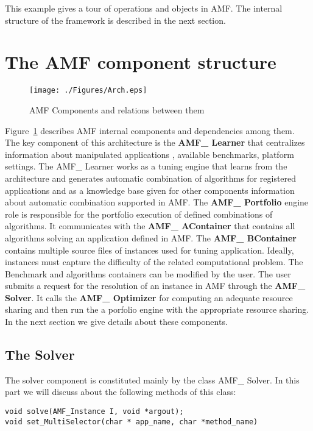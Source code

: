 This example gives a tour of operations and objects in AMF. The internal structure of the framework is 
described in the next section.

\section{The AMF component structure} \label{architecture}

\begin{figure}[!htbp]
\begin{center}
\texttt{[image: ./Figures/Arch.eps]}
\caption{AMF Components and relations between them}
 \label{Arch}
\end{center}
\end{figure}

Figure~\ref{Arch} describes AMF internal components and dependencies among them. The key component of this 
architecture is the \textbf{AMF\_ Learner} that centralizes information about manipulated applications , available benchmarks, 
platform settings. The AMF\_ Learner works as a tuning engine that learns from the architecture and generates automatic 
combination of algorithms for registered applications and as a knowledge base given for other components 
information about automatic combination supported in AMF. The  \textbf{AMF\_ Portfolio} engine role is responsible for the portfolio 
execution of defined  combinations of algorithms. It communicates with the \textbf{AMF\_ AContainer} that contains 
all algorithms solving an application defined in AMF. The \textbf{AMF\_ BContainer} contains 
multiple source files of instances used for tuning application. Ideally, instances must capture the difficulty of 
the related computational problem. The Benchmark and algorithms containers can be modified by the user. 
The user submits a request for the resolution of an instance in AMF through the \textbf{AMF\_ Solver}. It calls  
the \textbf{AMF\_ Optimizer} for computing an adequate resource sharing and then run the a porfolio engine with the
appropriate resource sharing. In the next section we give details about these components.


\subsection{The Solver}

The solver component is constituted mainly by the class AMF\_ Solver. In this part we will discuss 
about the following methods of this class:
\begin{verbatim}
void solve(AMF_Instance I, void *argout);
void set_MultiSelector(char * app_name, char *method_name)
\end{verbatim}

